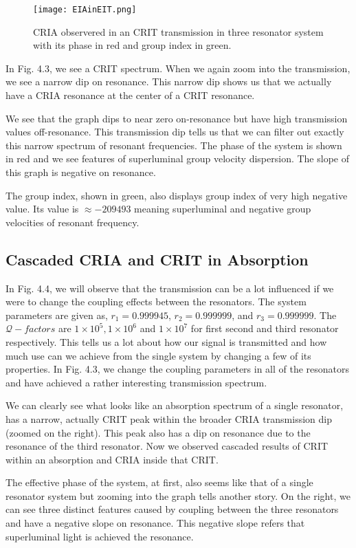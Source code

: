 \begin{figure}[t]
\centering
\texttt{[image: EIAinEIT.png]}
\caption{CRIA observered in an CRIT transmission in three resonator system with its phase in red and group index in green.}
\end{figure}

In Fig. 4.3, we see a CRIT spectrum. When we again zoom into the transmission, we see a narrow dip on resonance. This narrow dip shows us that we actually have a CRIA resonance at the center of a CRIT resonance.

We see that the graph dips to near zero on-resonance but have high transmission values off-resonance. This transmission dip tells us that we can filter out exactly this narrow spectrum of resonant frequencies. 
The phase of the system is shown in red and we see features of superluminal group velocity dispersion. The slope of this graph is negative on resonance.

The group index, shown in green, also displays group index of very high negative value. Its value is $\approx -209493$ meaning superluminal and negative group velocities of resonant frequency.


\subsection{Cascaded CRIA and CRIT in Absorption}
In Fig. 4.4, we will observe that the transmission can be a lot influenced if we were to change the coupling effects between the resonators. The system parameters are given as, $r_{1} = 0.999945$, $r_{2} = 0.999999$, and $r_{3} = 0.999999$. The $\mathcal{Q}-factors$ are $1\times10^{5}, 1\times10^{6}$ and $1\times10^{7}$ for first second and third resonator respectively. This tells us a lot about how our signal is transmitted and how much use can we achieve from the single system by changing a few of its properties. In Fig. 4.3, we change the coupling parameters in all of the resonators and have achieved a rather interesting transmission spectrum.

We can clearly see what looks like an absorption spectrum of a single resonator, has a narrow, actually CRIT peak within the broader CRIA transmission dip (zoomed on the right). This peak also has a dip on resonance due to the resonance of the third resonator. Now we observed cascaded results of CRIT within an absorption and CRIA inside that CRIT. 

The effective phase of the system, at first, also seems like that of a single resonator system but zooming into the graph tells another story. On the right, we can see three distinct features caused by coupling between the three resonators and have a negative slope on resonance. This negative slope refers that superluminal light is achieved the resonance.

